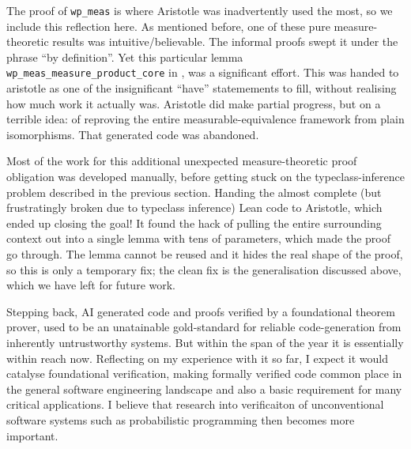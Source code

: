 The proof of \texttt{wp\_meas} is where Aristotle was inadvertently used the
most, so we include this reflection here.
As mentioned before, one of these pure measure-theoretic results was intuitive/believable. The informal proofs swept it under the phrase ``by
definition''. Yet this particular lemma \texttt{wp\_meas\_measure\_product\_core} in , was a significant effort.
This was handed to aristotle as one of the insignificant ``have'' statemements to fill, without realising
how much work it actually was. 
Aristotle did make partial progress, but on a terrible idea: of reproving the entire
measurable-equivalence framework from plain isomorphisms. That generated code was abandoned.

Most of the work for this additional unexpected measure-theoretic proof obligation was developed manually, before getting stuck on the typeclass-inference problem described in the previous section.
Handing the almost complete (but frustratingly broken due to typeclass inference) Lean code to Aristotle, which ended up closing the goal! It found the hack of
pulling the entire surrounding context out into a single lemma with tens of parameters, which made the proof go through. The lemma cannot be reused and it hides the
real shape of the proof, so this is only a temporary fix; the clean fix is the generalisation discussed above, which we have left for future work.

Stepping back, AI generated code and proofs verified by a foundational theorem prover, used to be an unatainable gold-standard for reliable code-generation from inherently
untrustworthy systems. But within the span of the year it is essentially within reach now. Reflecting on my experience with it so far,
I expect it would catalyse foundational verification, making formally verified code common place in the general software engineering landscape and also
a basic requirement for many critical applications. I believe that research into verificaiton of unconventional software systems such as probabilistic programming
then becomes more important.







